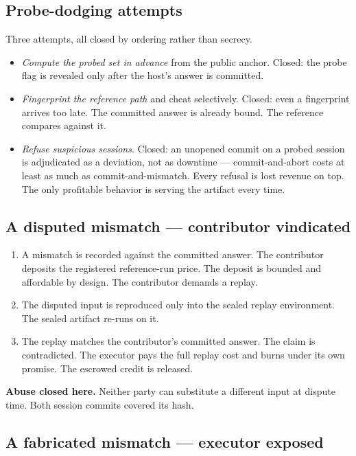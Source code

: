\documentclass[11pt]{article}
\begin{document}
\subsection{Probe-dodging attempts}

Three attempts, all closed by ordering rather than secrecy.
\begin{itemize}
\item \emph{Compute the probed set in advance} from the public
anchor. Closed: the probe flag is revealed only after the host's
answer is committed.
\item \emph{Fingerprint the reference path} and cheat
selectively. Closed: even a fingerprint arrives too late. The
committed answer is already bound. The reference compares against
it.
\item \emph{Refuse suspicious sessions}. Closed: an unopened
commit on a probed session is adjudicated as a deviation, not as
downtime --- commit-and-abort costs at least as much as
commit-and-mismatch. Every refusal is lost revenue on top. The
only profitable behavior is serving the artifact every time.
\end{itemize}

\subsection{A disputed mismatch --- contributor vindicated}

\begin{enumerate}
\item A mismatch is recorded against the committed answer. The
contributor deposits the registered reference-run price. The
deposit is bounded and affordable by design. The contributor
demands a replay.
\item The disputed input is reproduced only into the sealed
replay environment. The sealed artifact re-runs on it.
\item The replay matches the contributor's committed answer. The
claim is contradicted. The executor pays the full replay cost and
burns under its own promise. The escrowed credit is released.
\end{enumerate}
\textbf{Abuse closed here.} Neither party can substitute a
different input at dispute time. Both session commits covered its
hash.

\subsection{A fabricated mismatch --- executor exposed}
\end{document}
